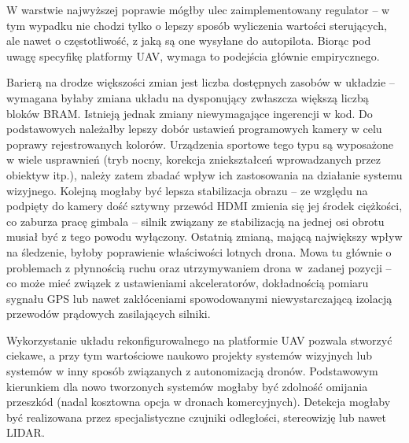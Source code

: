 W warstwie najwyższej poprawie mógłby ulec zaimplementowany regulator --  w tym wypadku nie chodzi tylko o lepszy sposób wyliczenia wartości sterujących, ale nawet o częstotliwość, z jaką są one wysyłane do autopilota. Biorąc pod uwagę specyfikę platformy UAV, wymaga to podejścia głównie empirycznego. 

Barierą na drodze większości zmian jest liczba dostępnych zasobów w układzie -- wymagana byłaby zmiana układu na dysponujący zwłaszcza większą liczbą bloków BRAM. 
Istnieją jednak zmiany niewymagające ingerencji w kod. 
Do podstawowych należałby lepszy dobór ustawień programowych kamery w celu poprawy rejestrowanych kolorów. 
Urządzenia sportowe tego typu są wyposażone w wiele usprawnień (tryb nocny, korekcja zniekształceń wprowadzanych przez obiektyw itp.), należy zatem zbadać wpływ ich zastosowania na działanie systemu wizyjnego. %
Kolejną mogłaby być lepsza stabilizacja obrazu -- ze względu na podpięty do kamery dość sztywny przewód HDMI zmienia się jej środek ciężkości, co zaburza pracę gimbala -- silnik związany ze stabilizacją na jednej osi obrotu musiał być z tego powodu wyłączony. 
Ostatnią zmianą, mającą największy wpływ na śledzenie, byłoby poprawienie właściwości lotnych drona. 
Mowa tu głównie o problemach z płynnością ruchu oraz utrzymywaniem drona w~zadanej pozycji -- co może mieć związek z ustawieniami akceleratorów,  dokładnością pomiaru sygnału GPS lub nawet zakłóceniami spowodowanymi niewystarczającą izolacją przewodów prądowych zasilających silniki.

Wykorzystanie układu rekonfigurowalnego na platformie UAV pozwala stworzyć ciekawe, a przy tym wartościowe naukowo projekty systemów wizyjnych lub systemów w inny sposób związanych z autonomizacją dronów.
Podstawowym kierunkiem dla nowo tworzonych systemów mogłaby być zdolność omijania przeszkód (nadal kosztowna opcja w dronach komercyjnych). Detekcja mogłaby być realizowana przez specjalistyczne czujniki odległości, stereowizję lub nawet LIDAR. 



